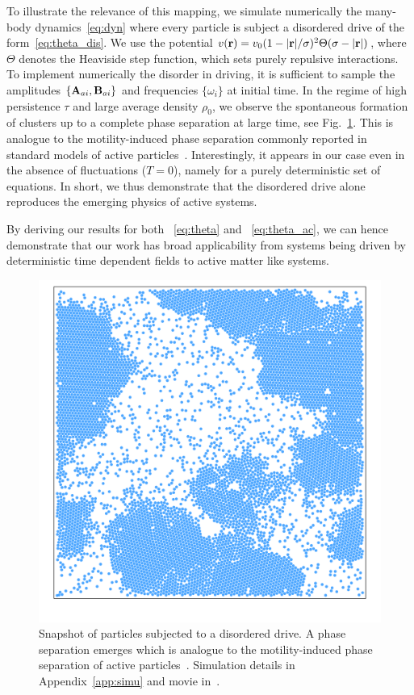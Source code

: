 \documentclass[superscriptaddress, twocolumn, prx, longbibliography, nofootinbib]{revtex4-1}
\begin{document}
To illustrate the relevance of this mapping, we simulate numerically the many-body dynamics~\eqref{eq:dyn} where every particle is subject a disordered drive of the form~\eqref{eq:theta_dis}. We use the potential $v({\bf r})=v_0(1-|{\bf r}|/\sigma)^2\Theta(\sigma-|{\bf r}|)$, where $\Theta$ denotes the Heaviside step function, which sets purely repulsive interactions. To implement numerically the disorder in driving, it is sufficient to sample the amplitudes $\{{\bf A}_{ai}, {\bf B}_{ai}\}$ and frequencies $\{\omega_i\}$ at initial time. In the regime of high persistence $\tau$ and large average density $\rho_0$, we observe the spontaneous formation of clusters up to a complete phase separation at large time, see Fig.~\ref{fig0}. This is analogue to the motility-induced phase separation commonly reported in standard models of active particles~\cite{Tailleur2008, Cates2015}. Interestingly, it appears in our case even in the absence of fluctuations ($T=0$), namely for a purely deterministic set of equations. In short, we thus demonstrate that the disordered drive alone reproduces the emerging physics of active systems. 

By deriving our results for both ~\eqref{eq:theta} and ~\eqref{eq:theta_ac}, we can hence demonstrate that our work has broad applicability \textendash from systems being driven by deterministic time dependent fields to active matter like systems. 

\begin{figure}
	\centering
	\includegraphics[width=.8\columnwidth]{fig0.pdf}
	\caption{\label{fig0}
		Snapshot of particles subjected to a disordered drive. A phase separation emerges which is analogue to the motility-induced phase separation of active particles~\cite{Tailleur2008, Cates2015}. Simulation details in Appendix~\ref{app:simu} and movie in~\cite{movie}.
	}
\end{figure}
\end{document}
